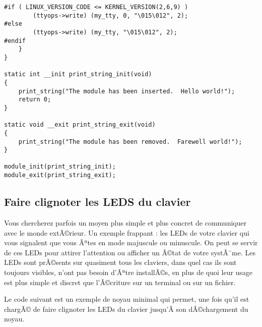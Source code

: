 \documentclass[11pt]{article}
\begin{document}
\begin{verbatim}
#if ( LINUX_VERSION_CODE <= KERNEL_VERSION(2,6,9) )
        (ttyops->write) (my_tty, 0, "\015\012", 2);
#else
        (ttyops->write) (my_tty, "\015\012", 2);
#endif
    }
}

static int __init print_string_init(void)
{
    print_string("The module has been inserted.  Hello world!");
    return 0;
}

static void __exit print_string_exit(void)
{
    print_string("The module has been removed.  Farewell world!");
}

module_init(print_string_init);
module_exit(print_string_exit);
\end{verbatim}

\subsection*{Faire clignoter les LEDS du clavier}
\label{sec-13-2}

Vous chercherez parfois un moyen plus simple et plus concret de communiquer avec le monde extÃ©rieur. Un exemple frappant : les LEDs de votre clavier qui vous signalent que vous Ãªtes en mode majuscule ou minuscule. On peut se servir de ces LEDs pour attirer l'attention ou afficher un Ã©tat de votre systÃ¨me. Les LEDs sont prÃ©sents sur quasiment tous les claviers, dans quel cas ils sont toujours visibles, n'ont pas besoin d'Ãªtre installÃ©s, en plus de quoi leur usage est plus simple et discret que l'Ã©criture sur un terminal ou sur un fichier.

Le code suivant est un exemple de noyau minimal qui permet, une fois qu'il est chargÃ© de faire clignoter les LEDs du clavier jusqu'Ã  son dÃ©chargement du noyau.
\end{document}
